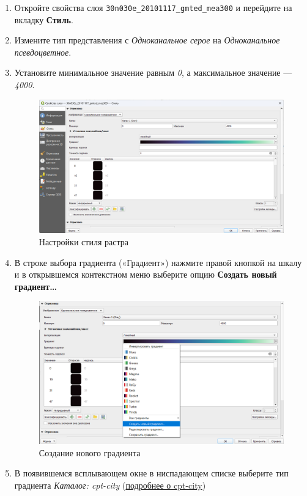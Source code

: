 \documentclass[
  12pt,
]{book}
\begin{document}
\begin{enumerate}
\def\labelenumi{\arabic{enumi}.}
\item
  Откройте свойства слоя \texttt{30n030e\_20101117\_gmted\_mea300} и перейдите на вкладку \textbf{Стиль}.
\item
  Измените тип представления с \emph{Одноканальное серое} на \emph{Одноканальное псевдоцветное}.
\item
  Установите минимальное значение равным \emph{0}, а максимальное значение --- \emph{4000}.

  \begin{figure}
  \centering
  \includegraphics{images/Ex01_MapGeneral/style1.png}
  \caption{Настройки стиля растра}
  \end{figure}
\item
  В строке выбора градиента («Градиент») нажмите правой кнопкой на шкалу и в открывшемся контекстном меню выберите опцию \textbf{Создать новый градиент\ldots{}}

  \begin{figure}
  \centering
  \includegraphics{images/Ex01_MapGeneral/style2.png}
  \caption{Создание нового градиента}
  \end{figure}
\item
  В появившемся всплывающем окне в ниспадающем списке выберите тип градиента \emph{Каталог: cpt-city} (\href{http://soliton.vm.bytemark.co.uk/pub/cpt-city/}{подробнее о cpt-city})


\end{enumerate}
\end{document}
